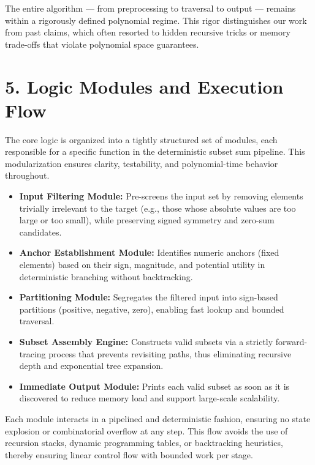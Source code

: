 \documentclass[11pt]{article}
\begin{document}
The entire algorithm — from preprocessing to traversal to output — remains within a rigorously defined polynomial regime. This rigor distinguishes our work from past claims, which often resorted to hidden recursive tricks or memory trade-offs that violate polynomial space guarantees.


\section*{5. Logic Modules and Execution Flow}

The core logic is organized into a tightly structured set of modules, each responsible for a specific function in the deterministic subset sum pipeline. This modularization ensures clarity, testability, and polynomial-time behavior throughout.

\begin{itemize}
  \item \textbf{Input Filtering Module:} Pre-screens the input set by removing elements trivially irrelevant to the target (e.g., those whose absolute values are too large or too small), while preserving signed symmetry and zero-sum candidates.
  
  \item \textbf{Anchor Establishment Module:} Identifies numeric anchors (fixed elements) based on their sign, magnitude, and potential utility in deterministic branching without backtracking.
  
  \item \textbf{Partitioning Module:} Segregates the filtered input into sign-based partitions (positive, negative, zero), enabling fast lookup and bounded traversal.
  
  \item \textbf{Subset Assembly Engine:} Constructs valid subsets via a strictly forward-tracing process that prevents revisiting paths, thus eliminating recursive depth and exponential tree expansion.
  
  \item \textbf{Immediate Output Module:} Prints each valid subset as soon as it is discovered to reduce memory load and support large-scale scalability.
\end{itemize}

Each module interacts in a pipelined and deterministic fashion, ensuring no state explosion or combinatorial overflow at any step. This flow avoids the use of recursion stacks, dynamic programming tables, or backtracking heuristics, thereby ensuring linear control flow with bounded work per stage.
\end{document}
